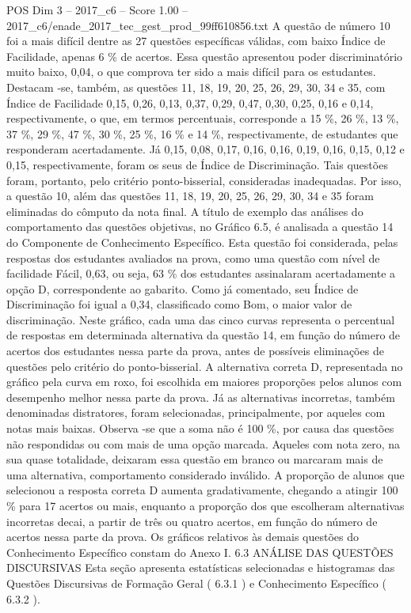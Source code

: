 \begin{textsample}{POS Dim 3 – 2017\_c6 – Score 1.00 – 2017\_c6/enade\_2017\_tec\_gest\_prod\_99ff610856.txt}
A questão de número 10 foi a mais difícil dentre as 27 questões específicas válidas, com baixo Índice de Facilidade, apenas 6 \% de acertos.
Essa questão apresentou poder discriminatório muito baixo, 0,04, o que comprova ter sido a mais difícil para os estudantes.
Destacam -se, também, as questões 11, 18, 19, 20, 25, 26, 29, 30, 34 e 35, com Índice de Facilidade 0,15, 0,26, 0,13, 0,37, 0,29, 0,47, 0,30, 0,25, 0,16 e 0,14, respectivamente, o que, em termos percentuais, corresponde a 15 \%, 26 \%, 13 \%, 37 \%, 29 \%, 47 \%, 30 \%, 25 \%, 16 \% e 14 \%, respectivamente, de estudantes que responderam acertadamente.
Já 0,15, 0,08, 0,17, 0,16, 0,16, 0,19, 0,16, 0,15, 0,12 e 0,15, respectivamente, foram os seus de Índice de Discriminação.
Tais questões foram, portanto, pelo critério ponto-bisserial, consideradas inadequadas.
Por isso, a questão 10, além das questões 11, 18, 19, 20, 25, 26, 29, 30, 34 e 35 foram eliminadas do cômputo da nota final.
A título de exemplo das análises do comportamento das questões objetivas, no Gráfico 6.5, é analisada a questão 14 do Componente de Conhecimento Específico.
Esta questão foi considerada, pelas respostas dos estudantes avaliados na prova, como uma questão com nível de facilidade Fácil, 0,63, ou seja, 63 \% dos estudantes assinalaram acertadamente a opção D, correspondente ao gabarito.
Como já comentado, seu Índice de Discriminação foi igual a 0,34, classificado como Bom, o maior valor de discriminação.
Neste gráfico, cada uma das cinco curvas representa o percentual de respostas em determinada alternativa da questão 14, em função do número de acertos dos estudantes nessa parte da prova, antes de possíveis eliminações de questões pelo critério do ponto-bisserial.
A alternativa correta D, representada no gráfico pela curva em roxo, foi escolhida em maiores proporções pelos alunos com desempenho melhor nessa parte da prova.
Já as alternativas incorretas, também denominadas distratores, foram selecionadas, principalmente, por aqueles com notas mais baixas.
Observa -se que a soma não é 100 \%, por causa das questões não respondidas ou com mais de uma opção marcada.
Aqueles com nota zero, na sua quase totalidade, deixaram essa questão em branco ou marcaram mais de uma alternativa, comportamento considerado inválido.
A proporção de alunos que selecionou a resposta correta D aumenta gradativamente, chegando a atingir 100 \% para 17 acertos ou mais, enquanto a proporção dos que escolheram alternativas incorretas decai, a partir de três ou quatro acertos, em função do número de acertos nessa parte da prova.
Os gráficos relativos às demais questões do Conhecimento Específico constam do Anexo I. 6.3 ANÁLISE DAS QUESTÕES DISCURSIVAS Esta seção apresenta estatísticas selecionadas e histogramas das Questões Discursivas de Formação Geral ( 6.3.1 ) e Conhecimento Específico ( 6.3.2 ).

\end{textsample}
